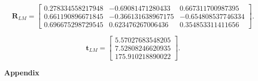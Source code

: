 \documentclass{../../assignment}
\begin{document}
\begin{problemlist}
\begin{enumerate}
\[
\mathbf{R}_{LM} = 
\begin{bmatrix}
0.278334558217948 &  -0.69081471280433 & 0.667311700987395\\
0.661190896671845 & -0.366131638967175 & -0.654808537746334\\
0.696675298729545 &  0.623476267006436 & 0.354853311411656
\end{bmatrix}.
\]

\[
\mathbf{t}_{LM} = 
\begin{bmatrix}
5.57027683548205\\
7.52808246620935\\
175.910218890022
\end{bmatrix}.
\]






\end{enumerate}
\end{problemlist}
\begin{flushleft}
\large{\textbf{Appendix}}
\end{flushleft}









\end{document}
